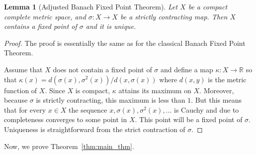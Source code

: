 \documentclass[10pt,reqno,a4paper]{amsart}
\numberwithin{figure}{section}
\numberwithin{equation}{section}
\newtheorem{lmm}[thm]{Lemma}
\begin{document}
\begin{lmm}[Adjusted Banach Fixed Point Theorem]
	\label{lmm:Banach_fixed_point}
	Let $X$ be a compact complete metric space, and $\sigma:X\to X$ be a strictly contracting map. Then $X$ contains a fixed point of $\sigma$ and it is unique.
\end{lmm}
\begin{proof}
	The proof is essentially the same as for the classical Banach Fixed Point Theorem.
	
	Assume that $X$ does not contain a fixed point of $\sigma$ and define a map $\kappa:X\to\mathbb{R}$ so that $\kappa(x)=d(\sigma(x),\sigma^2(x))/d(x,\sigma(x))$ where $d(x,y)$ is the metric function of $X$. Since $X$ is compact, $\kappa$ attains its maximum on $X$. Moreover, because $\sigma$ is strictly contracting, this maximum is less than $1$. But this means that for every $x\in X$ the sequence $x,\sigma(x),\sigma^2(x),...$ is Cauchy and due to completeness converges to some point in $X$. This point will be a fixed point of $\sigma$. Uniqueness is straightforward from the strict contraction of $\sigma$.
\end{proof}

Now, we prove Theorem~\ref{thm:main_thm}.
\end{document}
